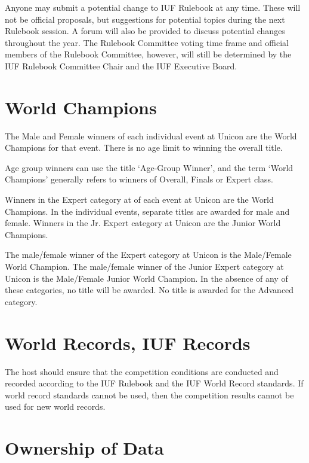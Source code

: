 Anyone may submit a potential change to IUF Rulebook at any time.
These will not be official proposals, but suggestions for potential topics during the next Rulebook session.
A forum will also be provided to discuss potential changes throughout the year.
The Rulebook Committee voting time frame and official members of the Rulebook Committee, however, will still be determined by the IUF Rulebook Committee Chair and the IUF Executive Board.

\section{World Champions}

The Male and Female winners of each individual event at Unicon are the World Champions for that event. 
There is no age limit to winning the overall title.

Age group winners can use the title `Age-Group Winner', and the term `World Champions' generally refers to winners of Overall, Finals or Expert class.

Winners in the Expert category at of each event at Unicon are the World Champions.
In the individual events, separate titles are awarded for male and female.
Winners in the Jr. Expert category at Unicon are the Junior World Champions.

The male/female winner of the Expert category at Unicon is the Male/Female World Champion.
The male/female winner of the Junior Expert category at Unicon is the Male/Female Junior World Champion.
In the absence of any of these categories, no title will be awarded.
No title is awarded for the Advanced category.

\section{World Records, IUF Records}

The host should ensure that the competition conditions are conducted and recorded according to the IUF Rulebook and the IUF World Record standards.
If world record standards cannot be used, then the competition results cannot be used for new world records.

\section{Ownership of Data}

